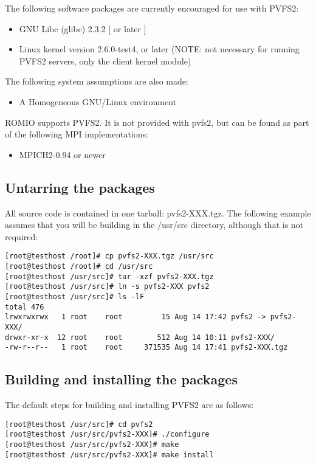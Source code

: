 \documentclass[11pt, letterpaper]{article}
\begin{document}
The following software packages are currently encouraged for use with PVFS2:
\begin{itemize}
\item GNU Libc (glibc) 2.3.2 [ or later ]
\item Linux kernel version 2.6.0-test4, or later (NOTE: not necessary for
  running PVFS2 servers, only the client kernel module)
\end{itemize}

The following system assumptions are also made:
\begin{itemize}
\item A Homogeneous GNU/Linux environment
\end{itemize}

ROMIO supports PVFS2.  It is not provided with pvfs2, but can be found as part
of the following MPI implementations:

\begin{itemize}
\item MPICH2-0.94 or newer
\end{itemize}

\subsection{Untarring the packages}

All source code is contained in one tarball: pvfs2-XXX.tgz.  The
following example assumes that you will be building in the /usr/src
directory, although that is not required:

\begin{verbatim}
[root@testhost /root]# cp pvfs2-XXX.tgz /usr/src
[root@testhost /root]# cd /usr/src
[root@testhost /usr/src]# tar -xzf pvfs2-XXX.tgz
[root@testhost /usr/src]# ln -s pvfs2-XXX pvfs2
[root@testhost /usr/src]# ls -lF
total 476
lrwxrwxrwx   1 root    root         15 Aug 14 17:42 pvfs2 -> pvfs2-XXX/
drwxr-xr-x  12 root    root        512 Aug 14 10:11 pvfs2-XXX/
-rw-r--r--   1 root    root     371535 Aug 14 17:41 pvfs2-XXX.tgz

\end{verbatim}

\subsection{Building and installing the packages}

The default steps for building and installing PVFS2 are as follows:

\begin{verbatim}
[root@testhost /usr/src]# cd pvfs2
[root@testhost /usr/src/pvfs2-XXX]# ./configure
[root@testhost /usr/src/pvfs2-XXX]# make
[root@testhost /usr/src/pvfs2-XXX]# make install
\end{verbatim}
\end{document}
